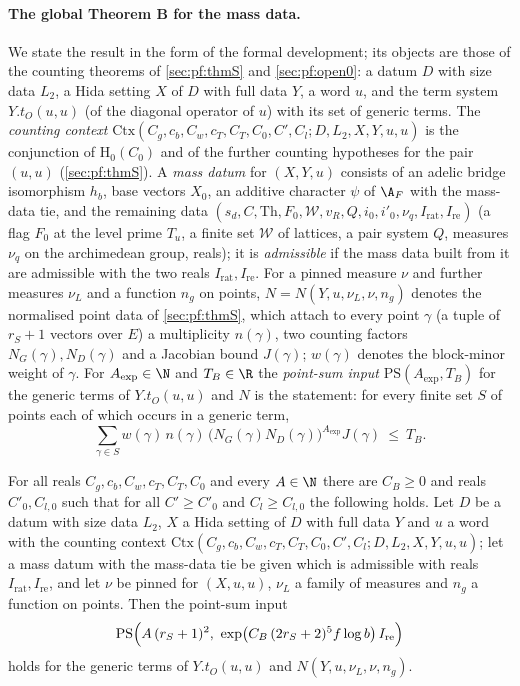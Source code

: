 \paragraph{The global Theorem B for the mass data.}
We state the result in the form of the formal development; its objects are those of the counting theorems of
\cref{sec:pf:thmS} and \cref{sec:pf:open0}: a datum $D$ with size data $L_2$, a Hida setting $X$ of $D$ with full data $Y$,
a word $u$, and the term system $Y.t_O(u,u)$ (of the diagonal operator of $u$) with its set of generic terms. The
\emph{counting context} $\mathrm{Ctx}(C_g,c_b,C_w,c_T,C_T,C_0,C',C_l;D,L_2,X,Y,u,u)$ is the conjunction of $\mathrm{H}_0(C_0)$ and
of the further counting hypotheses for the pair $(u,u)$ (\cref{sec:pf:thmS}). A \emph{mass datum} for $(X,Y,u)$ consists of an
adelic bridge isomorphism $h_b$, base vectors $X_0$, an additive character $\psi$ of $\A_F$ with the mass-data tie, and the
remaining data $(s_d,C,\mathrm{Th},F_0,\mathcal W,v_R,Q,i_0,i'_0,\nu_q,I_{\mathrm{rat}},I_{\mathrm{re}})$ (a flag $F_0$ at the level prime
$T_u$, a finite set $\mathcal W$ of lattices, a pair system $Q$, measures $\nu_q$ on the archimedean group, reals); it is
\emph{admissible} if the mass data built from it are admissible with the two reals $I_{\mathrm{rat}},I_{\mathrm{re}}$. For a pinned
measure $\nu$ and further measures $\nu_L$ and a function $n_g$ on points, $N=N(Y,u,\nu_L,\nu,n_g)$ denotes the normalised point
data of \cref{sec:pf:thmS}, which attach to every point $\gamma$ (a tuple of $r_S+1$ vectors over $E$) a multiplicity $n(\gamma)$,
two counting factors $N_G(\gamma),N_D(\gamma)$ and a Jacobian bound $J(\gamma)$; $w(\gamma)$ denotes the block-minor weight of $\gamma$.
For $A_{\exp}\in\N$ and $T_B\in\R$ the \emph{point-sum input} $\mathrm{PS}(A_{\exp},T_B)$ for the generic terms of $Y.t_O(u,u)$
and $N$ is the statement: for every finite set $S$ of points each of which occurs in a generic term,
\[
\sum_{\gamma\in S}w(\gamma)\,n(\gamma)\,\bigl(N_G(\gamma)N_D(\gamma)\bigr)^{A_{\exp}}J(\gamma)\ \le\ T_B .
\]

\begin{theorem}\label{pf:sh-misc:thmB}
For all reals $C_g,c_b,C_w,c_T,C_T,C_0$ and every $A\in\N$ there are $C_B\ge0$ and reals $C'_0,C_{l,0}$ such that for all
$C'\ge C'_0$ and $C_l\ge C_{l,0}$ the following holds. Let $D$ be a datum with size data $L_2$, $X$ a Hida setting of $D$ with
full data $Y$ and $u$ a word with the counting context $\mathrm{Ctx}(C_g,c_b,C_w,c_T,C_T,C_0,C',C_l;D,L_2,X,Y,u,u)$; let a
mass datum with the mass-data tie be given which is admissible with reals $I_{\mathrm{rat}},I_{\mathrm{re}}$, and let $\nu$ be pinned
for $(X,u,u)$, $\nu_L$ a family of measures and $n_g$ a function on points. Then the point-sum input
\[
\mathrm{PS}\Bigl(A\,(r_S+1)^2,\ \exp\bigl(C_B\,(2r_S+2)^5f\log b\bigr)\,I_{\mathrm{re}}\Bigr)
\]
holds for the generic terms of $Y.t_O(u,u)$ and $N(Y,u,\nu_L,\nu,n_g)$.
\end{theorem}

